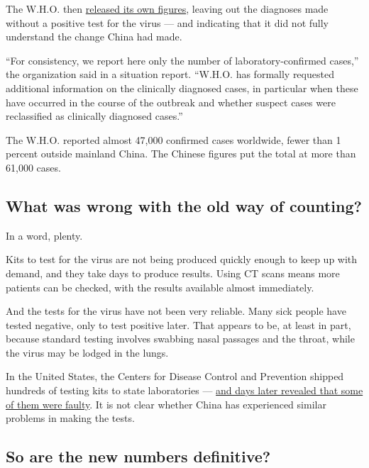 The W.H.O. then
\href{https://www.who.int/docs/default-source/coronaviruse/situation-reports/20200213-sitrep-24-covid-19.pdf?sfvrsn=9a7406a4_2}{released
its own figures}, leaving out the diagnoses made without a positive test
for the virus --- and indicating that it did not fully understand the
change China had made.

``For consistency, we report here only the number of
laboratory-confirmed cases,'' the organization said in a situation
report. ``W.H.O. has formally requested additional information on the
clinically diagnosed cases, in particular when these have occurred in
the course of the outbreak and whether suspect cases were reclassified
as clinically diagnosed cases.''

The W.H.O. reported almost 47,000 confirmed cases worldwide, fewer than
1 percent outside mainland China. The Chinese figures put the total at
more than 61,000 cases.

\hypertarget{what-was-wrong-with-the-old-way-of-counting}{%
\subsection{What was wrong with the old way of
counting?}\label{what-was-wrong-with-the-old-way-of-counting}}

In a word, plenty.

Kits to test for the virus are not being produced quickly enough to keep
up with demand, and they take days to produce results. Using CT scans
means more patients can be checked, with the results available almost
immediately.

And the tests for the virus have not been very reliable. Many sick
people have tested negative, only to test positive later. That appears
to be, at least in part, because standard testing involves swabbing
nasal passages and the throat, while the virus may be lodged in the
lungs.

In the United States, the Centers for Disease Control and Prevention
shipped hundreds of testing kits to state laboratories ---
\href{https://www.nytimes3xbfgragh.onion/2020/02/12/health/coronavirus-test-kits-cdc.html}{and
days later revealed that some of them were faulty}. It is not clear
whether China has experienced similar problems in making the tests.

\hypertarget{so-are-the-new-numbers-definitive}{%
\subsection{So are the new numbers
definitive?}\label{so-are-the-new-numbers-definitive}}

